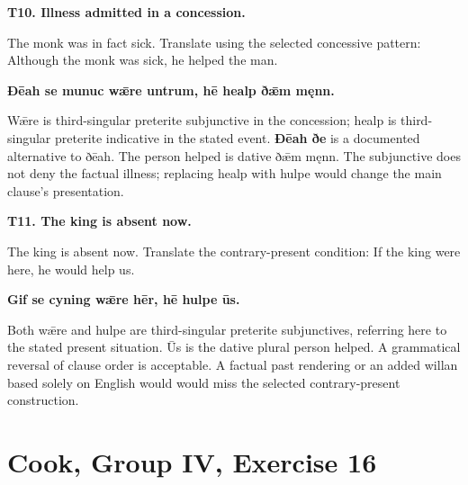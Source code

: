\par\begin{minipage}{\linewidth}\raggedright
\textbf{T10. Illness admitted in a concession.}

The monk was in fact sick. Translate using the selected concessive pattern: Although the monk was sick, he helped the man.

\textbf{Ðēah se munuc wǣre untrum, hē healp ðǣm męnn.}

Wǣre is third-singular preterite subjunctive in the concession; healp is third-singular preterite indicative in the stated event. \textbf{Ðēah ðe} is a documented alternative to ðēah. The person helped is dative ðǣm męnn. The subjunctive does not deny the factual illness; replacing healp with hulpe would change the main clause's presentation.

\end{minipage}\par\addvspace{4pt}

\par\begin{minipage}{\linewidth}\raggedright
\textbf{T11. The king is absent now.}

The king is absent now. Translate the contrary-present condition: If the king were here, he would help us.

\textbf{Gif se cyning wǣre hēr, hē hulpe ūs.}

Both wǣre and hulpe are third-singular preterite subjunctives, referring here to the stated present situation. Ūs is the dative plural person helped. A grammatical reversal of clause order is acceptable. A factual past rendering or an added willan based solely on English would would miss the selected contrary-present construction.

\end{minipage}\par\addvspace{4pt}

\section*{Cook, Group IV, Exercise 16}

